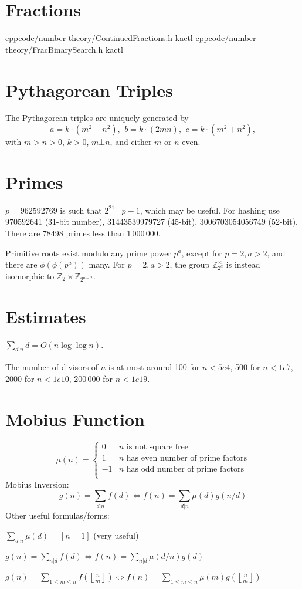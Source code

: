 \section{Fractions}
    {}{}
    {cpp}{code/number-theory/ContinuedFractions.h}
    {kactl}
    {}{}
    {cpp}{code/number-theory/FracBinarySearch.h}
    {kactl}

\section{Pythagorean Triples}
 The Pythagorean triples are uniquely generated by
 \[ a=k\cdot (m^{2}-n^{2}),\ \,b=k\cdot (2mn),\ \,c=k\cdot (m^{2}+n^{2}), \]
 with $m > n > 0$, $k > 0$, $m \bot n$, and either $m$ or $n$ even.

\section{Primes}
	$p=962592769$ is such that $2^{21} \mid p-1$, which may be useful. For hashing
	use 970592641 (31-bit number), 31443539979727 (45-bit), 3006703054056749
	(52-bit). There are 78498 primes less than 1\,000\,000.

	Primitive roots exist modulo any prime power $p^a$, except for $p = 2, a > 2$, and there are $\phi(\phi(p^a))$ many.
	For $p = 2, a > 2$, the group $\mathbb Z_{2^a}^\times$ is instead isomorphic to $\mathbb Z_2 \times \mathbb Z_{2^{a-2}}$.

\section{Estimates}
	$\sum_{d|n} d = O(n \log \log n)$.

	The number of divisors of $n$ is at most around 100 for $n < 5e4$, 500 for $n < 1e7$, 2000 for $n < 1e10$, 200\,000 for $n < 1e19$.

\section{Mobius Function}
\[
	\mu(n) = \begin{cases} 0 & n \textrm{ is not square free}\\ 1 & n \textrm{ has even number of prime factors}\\ -1 & n \textrm{ has odd number of prime factors}\\\end{cases}
\]
  Mobius Inversion:
  \[ g(n) = \sum_{d|n} f(d) \Leftrightarrow f(n) = \sum_{d|n} \mu(d)g(n/d) \]
  Other useful formulas/forms:

  $ \sum_{d | n} \mu(d) = [ n = 1] $ (very useful)

  $ g(n) = \sum_{n|d} f(d) \Leftrightarrow f(n) = \sum_{n|d} \mu(d/n)g(d)$

 $ g(n) = \sum_{1 \leq m \leq n} f(\left\lfloor\frac{n}{m}\right \rfloor ) \Leftrightarrow f(n) = \sum_{1\leq m\leq n} \mu(m)g(\left\lfloor\frac{n}{m}\right\rfloor)$
